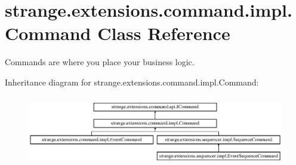 \hypertarget{classstrange_1_1extensions_1_1command_1_1impl_1_1_command}{\section{strange.\-extensions.\-command.\-impl.\-Command Class Reference}
\label{classstrange_1_1extensions_1_1command_1_1impl_1_1_command}
}


Commands are where you place your business logic.  


Inheritance diagram for strange.\-extensions.\-command.\-impl.\-Command\-:\begin{figure}[H]
\begin{center}
\leavevmode
\includegraphics[height=3.102493cm]{classstrange_1_1extensions_1_1command_1_1impl_1_1_command}
\end{center}
\end{figure}
